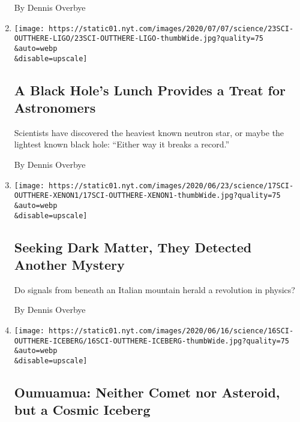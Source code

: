 \begin{enumerate}
  By Dennis Overbye
\item
  \href{/2020/06/24/science/black-hole-ligo-gravitational.html}{}

  \texttt{[image: https://static01.nyt.com/images/2020/07/07/science/23SCI-OUTTHERE-LIGO/23SCI-OUTTHERE-LIGO-thumbWide.jpg?quality=75\\\&auto=webp\\\&disable=upscale]}

  \hypertarget{a-black-holes-lunch-provides-a-treat-for-astronomers}{%
  \subsection{A Black Hole's Lunch Provides a Treat for
  Astronomers}\label{a-black-holes-lunch-provides-a-treat-for-astronomers}}

  Scientists have discovered the heaviest known neutron star, or maybe
  the lightest known black hole: ``Either way it breaks a record.''

  By Dennis Overbye
\item
  \href{/2020/06/17/science/xenon-axions-neutrinos-tritium.html}{}

  \texttt{[image: https://static01.nyt.com/images/2020/06/23/science/17SCI-OUTTHERE-XENON1/17SCI-OUTTHERE-XENON1-thumbWide.jpg?quality=75\\\&auto=webp\\\&disable=upscale]}

  \hypertarget{seeking-dark-matter-they-detected-another-mystery}{%
  \subsection{Seeking Dark Matter, They Detected Another
  Mystery}\label{seeking-dark-matter-they-detected-another-mystery}}

  Do signals from beneath an Italian mountain herald a revolution in
  physics?

  By Dennis Overbye
\item
  \href{/2020/06/15/science/oumuamua-astronomy-comets.html}{}

  \texttt{[image: https://static01.nyt.com/images/2020/06/16/science/16SCI-OUTTHERE-ICEBERG/16SCI-OUTTHERE-ICEBERG-thumbWide.jpg?quality=75\\\&auto=webp\\\&disable=upscale]}

  \hypertarget{oumuamua-neither-comet-nor-asteroid-but-a-cosmic-iceberg}{%
  \subsection{Oumuamua: Neither Comet nor Asteroid, but a Cosmic
  Iceberg}\label{oumuamua-neither-comet-nor-asteroid-but-a-cosmic-iceberg}}


\end{enumerate}
